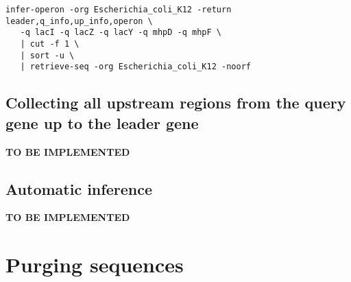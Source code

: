 \begin{lstlisting}
infer-operon -org Escherichia_coli_K12 -return leader,q_info,up_info,operon \
   -q lacI -q lacZ -q lacY -q mhpD -q mhpF \
   | cut -f 1 \
   | sort -u \
   | retrieve-seq -org Escherichia_coli_K12 -noorf
\end{lstlisting}


\subsection{Collecting all upstream regions from the query gene up to
  the leader gene}

\textbf{TO BE IMPLEMENTED}

\subsection{Automatic inference}

\textbf{TO BE IMPLEMENTED}


\section{Purging sequences}

\tbw
